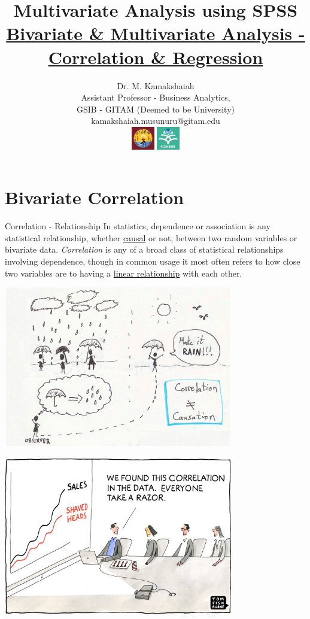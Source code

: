 \documentclass{beamer}
\title{Multivariate Analysis using SPSS \\ \small{\underline{Bivariate \& Multivariate Analysis - Correlation \& Regression}}}
\author{Dr. M. Kamakshaiah \\ Assistant Professor - Business Analytics, \\ GSIB - GITAM \tiny{(Deemed to be University)} \\ \small{kamakshaiah.musunuru@gitam.edu} \\ \vspace{2cm} \includegraphics[height=1cm, width=1cm]{gitam_logo} \includegraphics[height=1cm, width=1cm]{gsib_logo}}
\date{}
\begin{document}
\titlepage 
\tableofcontents

\section{Bivariate Correlation}

\begin{frame}{Correlation - Relationship}
\centering 
In statistics, dependence or association is any statistical relationship, whether \underline{causal} or not, between two random variables or bivariate data. \emph{Correlation} is any of a broad class of statistical relationships involving dependence, though in common usage it most often refers to how close two variables are to having a \underline{linear relationship} with each other.
	
\end{frame}

\begin{frame}
	\includegraphics[height=7cm, width=10cm]{cor_cause}
\end{frame}

\begin{frame}
\includegraphics[height=7cm, width=10cm]{cor_cause_1}	
\end{frame}
\end{document}
